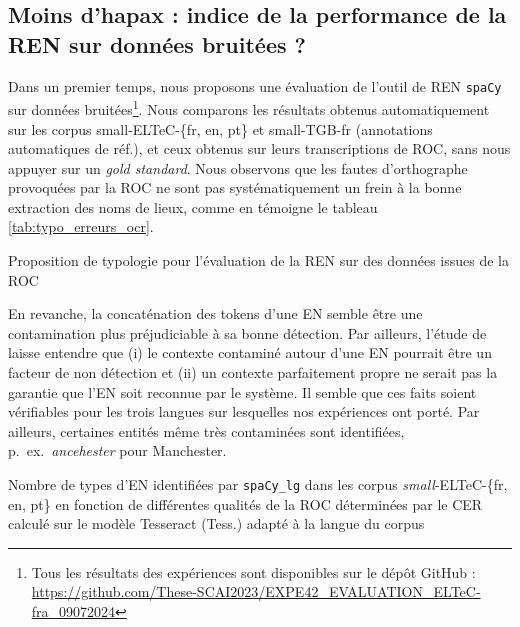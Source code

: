 \subsection{Moins d'hapax : indice de la performance de la REN sur données bruitées ?}
\label{subsec:eval_manu_OCR-IMPACT-NER}
Dans un premier temps, nous proposons une évaluation de l'outil de REN \texttt{spaCy} sur données bruitées\footnote{Tous les résultats des expériences sont disponibles sur le dépôt GitHub : \url{https://github.com/These-SCAI2023/EXPE42_EVALUATION_ELTeC-fra_09072024}}. Nous comparons les résultats obtenus automatiquement sur les corpus small-ELTeC-\{fr, en, pt\} et small-TGB-fr (annotations automatiques de réf.), et ceux obtenus sur leurs transcriptions de ROC, sans nous appuyer sur un \textit{gold standard}. Nous observons que les fautes d'orthographe provoquées par la ROC ne sont pas systématiquement un frein à la bonne extraction des noms de lieux, comme en témoigne le tableau \ref{tab:typo_erreurs_ocr}.
\begin{table}[h!]
\small
    \centering
   
    \caption{Proposition de typologie pour l'évaluation de la REN sur des données issues de la ROC}
    \label{tab:typo_erreurs_ocr}
\end{table}

En revanche, la concaténation des tokens d'une EN semble être une contamination plus préjudiciable à sa bonne détection. Par ailleurs, l'étude de  laisse entendre que (i) le contexte contaminé autour d'une EN pourrait être un facteur de non détection et (ii) un contexte parfaitement propre ne serait pas la garantie que l'EN soit reconnue par le système. Il semble que ces faits soient vérifiables pour les trois langues sur lesquelles nos expériences ont porté. Par ailleurs, certaines entités même très contaminées sont identifiées, p.\ ex.\  \textit{\og{}ancehester\fg{}} pour \og{}Manchester\fg{}. 


\begin{table}[h!]
    \centering
    \small
    
    \caption{Nombre de types d'EN identifiées par \texttt{spaCy\_lg} dans les corpus \textit{small}-ELTeC-\{fr, en, pt\}  en fonction de différentes qualités de la ROC déterminées par le CER calculé sur le modèle Tesseract (Tess.) adapté à la langue du corpus 
    }
    \label{tab:ELTeC_bon_mauvais}
\end{table}

